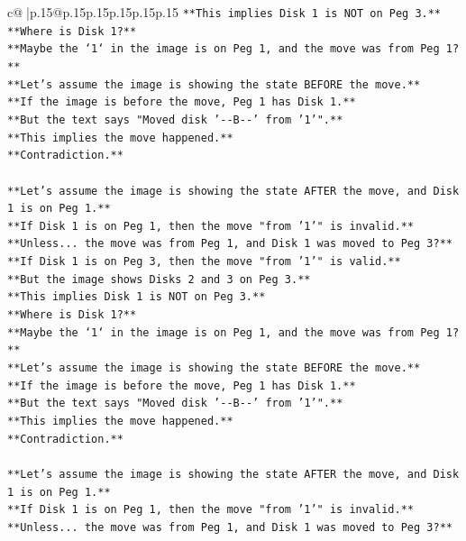 \documentclass{article}
\begin{document}
{\begin{supertabular}{c@{$\;$}|p{.15\linewidth}@{}p{.15\linewidth}p{.15\linewidth}p{.15\linewidth}p{.15\linewidth}p{.15\linewidth}}
{{{\texttt{**This implies Disk 1 is NOT on Peg 3.**} \\
\texttt{**Where is Disk 1?**} \\
\texttt{**Maybe the `1` in the image is on Peg 1, and the move was from Peg 1?**} \\
\texttt{**Let's assume the image is showing the state BEFORE the move.**} \\
\texttt{**If the image is before the move, Peg 1 has Disk 1.**} \\
\texttt{**But the text says "Moved disk '{-}{-}B{-}{-}' from '1'".**} \\
\texttt{**This implies the move happened.**} \\
\texttt{**Contradiction.**} \\
\\ 
\texttt{**Let's assume the image is showing the state AFTER the move, and Disk 1 is on Peg 1.**} \\
\texttt{**If Disk 1 is on Peg 1, then the move "from '1'" is invalid.**} \\
\texttt{**Unless... the move was from Peg 1, and Disk 1 was moved to Peg 3?**} \\
\texttt{**If Disk 1 is on Peg 3, then the move "from '1'" is valid.**} \\
\texttt{**But the image shows Disks 2 and 3 on Peg 3.**} \\
\texttt{**This implies Disk 1 is NOT on Peg 3.**} \\
\texttt{**Where is Disk 1?**} \\
\texttt{**Maybe the `1` in the image is on Peg 1, and the move was from Peg 1?**} \\
\texttt{**Let's assume the image is showing the state BEFORE the move.**} \\
\texttt{**If the image is before the move, Peg 1 has Disk 1.**} \\
\texttt{**But the text says "Moved disk '{-}{-}B{-}{-}' from '1'".**} \\
\texttt{**This implies the move happened.**} \\
\texttt{**Contradiction.**} \\
\\ 
\texttt{**Let's assume the image is showing the state AFTER the move, and Disk 1 is on Peg 1.**} \\
\texttt{**If Disk 1 is on Peg 1, then the move "from '1'" is invalid.**} \\
\texttt{**Unless... the move was from Peg 1, and Disk 1 was moved to Peg 3?**} \\
}}}
\end{supertabular}}
\end{document}
